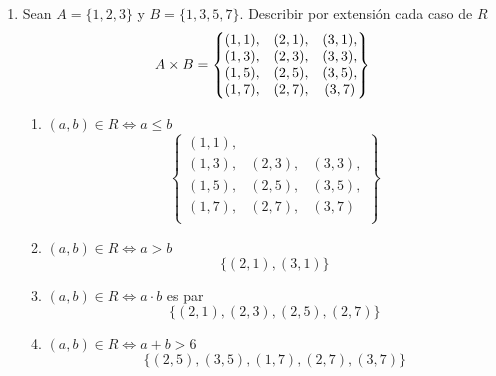 \documentclass[../practica.root.tex]{subfiles}
\begin{document}
\begin{enumerate}
    \item Sean $A = \{1, 2, 3\}$ y $B = \{1, 3, 5, 7\}$. Describir por extensión cada caso de $R$
          \[
              A \times B = \begin{Bmatrix}
                  (1,1), & (2,1), & (3,1), \\
                  (1,3), & (2,3), & (3,3), \\
                  (1,5), & (2,5), & (3,5), \\
                  (1,7), & (2,7), & (3,7)  \\
              \end{Bmatrix}
          \]
          \begin{enumerate}
              \item $(a, b) \in R \iff a \leq b$
                    \[
                        \begin{Bmatrix}
                            (1,1), &        &        \\
                            (1,3), & (2,3), & (3,3), \\
                            (1,5), & (2,5), & (3,5), \\
                            (1,7), & (2,7), & (3,7)  \\
                        \end{Bmatrix}
                    \]
              \item $(a, b) \in R \iff a > b$
                    \[ \{ (2, 1), (3, 1) \} \]
              \item $(a, b) \in R \iff a \cdot b$ es par
                    \[ \{ (2, 1), (2, 3), (2, 5), (2, 7) \} \]
              \item $(a, b) \in R \iff a + b > 6$
                    \[ \{ (2, 5), (3, 5), (1, 7), (2, 7), (3, 7) \} \]
          \end{enumerate}


\end{enumerate}
\end{document}
